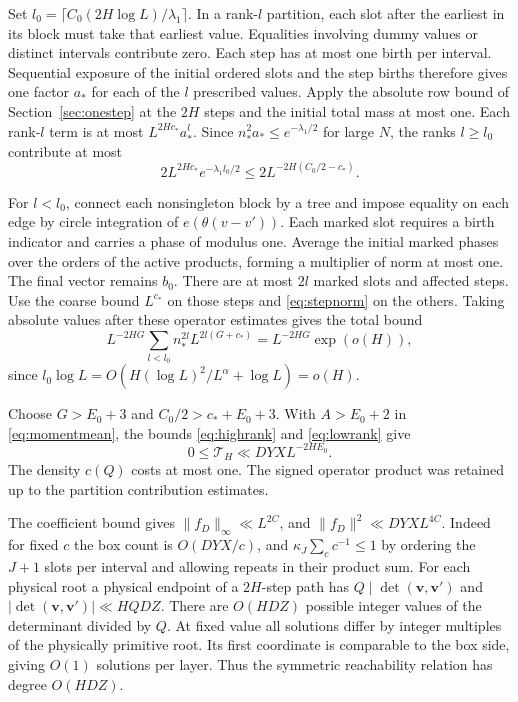 \documentclass[11pt]{amsart}
\numberwithin{equation}{section}
\theoremstyle{remark}
\begin{document}
Set $l_0=\lceil C_0(2H\log L)/\lambda_1\rceil$. In a rank-$l$
partition, each slot after the earliest in its block must take
that earliest value. Equalities involving dummy values or distinct
intervals contribute zero. Each step has at most one birth per
interval. Sequential exposure of the initial ordered slots and
the step births therefore gives one factor $a_*$ for each of the
$l$ prescribed values. Apply the absolute row bound of
Section~\ref{sec:onestep} at the $2H$ steps and the initial total
mass at most one. Each rank-$l$ term is at most $L^{2Hc_*}a_*^l$.
Since $n_*^2a_*\le e^{-\lambda_1/2}$ for large $N$, the ranks
$l\ge l_0$ contribute at most
\begin{equation}\label{eq:highrank}
 2L^{2Hc_*} e^{-\lambda_1 l_0/2}
 \le 2L^{-2H(C_0/2-c_*)}.
\end{equation}

For $l<l_0$, connect each nonsingleton block by a tree and impose
equality on each edge by circle integration of $e(\theta(v-v'))$.
Each marked slot requires a birth indicator and carries a phase
of modulus one. Average the initial marked phases over the orders
of the active products, forming a multiplier of norm at most one.
The final vector remains $b_0$. There are at most $2l$ marked
slots and affected steps. Use the coarse bound $L^{c_*}$ on those
steps and \eqref{eq:stepnorm} on the others. Taking absolute values
after these operator estimates gives the total bound
\begin{equation}\label{eq:lowrank}
 L^{-2HG}\sum_{l<l_0}n_*^{2l}L^{2l(G+c_*)}=L^{-2HG}\exp(o(H)),
\end{equation}
since $l_0\log L=O(H(\log L)^2/L^\alpha+\log L)=o(H)$.

Choose $G>E_0+3$ and $C_0/2>c_*+E_0+3$. With $A>E_0+2$ in
\eqref{eq:momentmean}, the bounds \eqref{eq:highrank} and
\eqref{eq:lowrank} give
\begin{equation}\label{eq:physicalmoment}
 0\le\mathcal T_H\ll DYX L^{-2HE_0}.
\end{equation}
The density $c(Q)$ costs at most one. The signed operator product
was retained up to the partition contribution estimates.

The coefficient bound gives $\|f_D\|_\infty\ll L^{2C}$, and
$\|f_D\|^2\ll DYX L^{4C}$. Indeed for fixed $c$ the box count is
$O(DYX/c)$, and $\kappa_J\sum_c c^{-1}\le1$ by ordering the
$J+1$ slots per interval and allowing repeats in their product sum.
For each physical root a physical endpoint of a $2H$-step path
has $Q\mid\det(\mathbf v,\mathbf v')$ and
$|\det(\mathbf v,\mathbf v')|\ll HQDZ$. There are $O(HDZ)$ possible
integer values of the determinant divided by $Q$. At fixed value
all solutions differ by integer multiples of the physically
primitive root. Its first coordinate is comparable to the
box side, giving $O(1)$ solutions per layer. Thus the symmetric
reachability relation has degree $O(HDZ)$.
\end{document}
